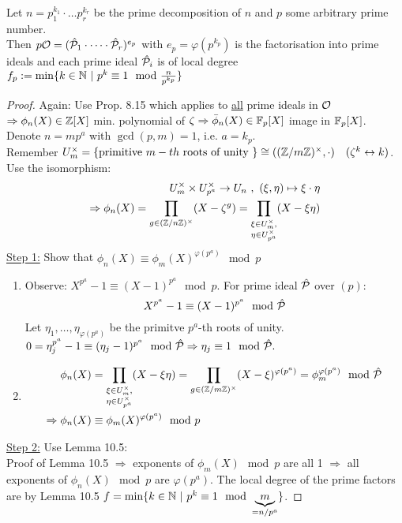 \begin{Prop}
Let $n=p_1^{k_1} \cdot \ldots p_r^{k_r}$ be the prime decomposition of $n$ and $p$ some arbitrary prime number.\\
Then $p \mathcal{O}=(\hat{\mathcal{P}}_1 \cdot \dots \cdot \hat{\mathcal{P}}_r)^{e_p}$ with $e_p=\varphi(p^{k_p})$ is the factorisation into prime ideals and each prime ideal $\hat{\mathcal{P}}_i$ is of local degree $f_p:=\min\{k \in \mathbb{N} \ | \ p^k \equiv 1 \mod \frac{n}{p^{k_p}}\}$
\end{Prop}

\begin{proof}
Again: Use Prop. 8.15 which applies to \underline{all} prime ideals in $\mathcal{O}$\\
$\Rightarrow \phi_n(X) \in \mathbb{Z}[X]$ min. polynomial of $\zeta \Rightarrow \bar{\phi}_n(X) \in \mathbb{F}_p[X]$ image in $\mathbb{F}_p[X]$.\\
Denote $n=mp^a$ with $\gcd(p,m)=1$, i.e. $a=k_p$.\\
Remember $U_m^\times=\{\text{primitive } m-th \text{ roots of unity }\} \cong ((\mathbb{Z}/m\mathbb{Z})^\times, \cdot) \quad (\zeta^k\leftrightarrow k)$.\\
Use the isomorphism:
\begin{align*}
U_m^\times \times U_{p^a}^\times \to U_n \ , \ (\xi, \eta) \mapsto \xi \cdot \eta\\
\Rightarrow \phi_n(X)=\prod_{g \in (\mathbb{Z}/n\mathbb{Z})^\times} (X -\zeta^g) = \prod_{\substack{\xi \in U_m^\times,\\ \eta \in U_{p^a}^\times}} (X -\xi \eta)
\end{align*}
\underline{Step 1:} Show that $\phi_n(X) \equiv \phi_m(X)^{\varphi(p^a)} \mod p$
\begin{enumerate}[(1)]
\item Observe: $X^{p^a}-1 \equiv (X-1)^{p^a} \mod p$. For prime ideal $\hat{\mathcal{P}}$ over $(p)$:
\[X^{p^a}-1 \equiv (X-1)^{p^a} \mod {\hat{\mathcal{P}}}\]
Let $\eta_1, \dots, \eta_{\varphi(p^a)}$ be the primitve $p^a$-th roots of unity.\\
$0=\eta_j^{p^a}-1 \equiv (\eta_j-1)^{p^a}\mod {\hat{\mathcal{P}}} \Rightarrow \eta_j \equiv 1 \mod {\hat{\mathcal{P}}}.$
\item \begin{align*}
\phi_n(X)&=\prod_{\substack{\xi \in U_m^\times,\\ \eta \in U_{p^a}^\times}} (X -\xi \eta)=\prod_{g \in (\mathbb{Z}/m\mathbb{Z})^\times} (X -\xi)^{\varphi(p^a)} = \phi_m^{\varphi(p^a)} \mod {\hat{\mathcal{P}}}\\
\Rightarrow \phi_n(X) &\equiv \phi_m(X)^{\varphi(p^a)} \mod p
\end{align*}
\end{enumerate}
\underline{Step 2:} Use Lemma 10.5:\\ 
Proof of Lemma 10.5 $\Rightarrow$ exponents of $\phi_m(X) \mod p$ are all 1 $\Rightarrow$ all exponents of $\phi_n(X) \mod p$ are $\varphi(p^a)$. The local degree of the prime factors are by Lemma 10.5
\linebreak $f=\min\{k \in \mathbb{N} \ | \ p^k \equiv 1 \mod \underbrace{m}_{=n/p^a}\}$.
\end{proof}

